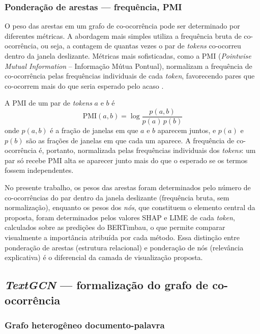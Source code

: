 \documentclass[
    12pt,                %
    openright,           %
    oneside,             %
    a4paper,             %
    english,             %
    brazil               %
]{abntex2}
\begin{document}
\subsubsection{Ponderação de arestas — frequência, PMI}
\label{subsubsec:grafos_ponderacao}

O peso das arestas em um grafo de co-ocorrência pode ser determinado por diferentes métricas. A abordagem mais simples utiliza a frequência bruta de co-ocorrência, ou seja, a contagem de quantas vezes o par de \textit{tokens} co-ocorreu dentro da janela deslizante. Métricas mais sofisticadas, como a PMI (\textit{Pointwise Mutual Information} -- Informação Mútua Pontual), normalizam a frequência de co-ocorrência pelas frequências individuais de cada \textit{token}, favorecendo pares que co-ocorrem mais do que seria esperado pelo acaso \cite{yao2019}.

A PMI de um par de \textit{tokens} $a$ e $b$ é
\begin{equation}
\text{PMI}(a,b) = \log\frac{p(a,b)}{p(a)\,p(b)}
\end{equation}
onde $p(a,b)$ é a fração de janelas em que $a$ e $b$ aparecem juntos, e $p(a)$ e $p(b)$ são as frações de janelas em que cada um aparece. A frequência de co-ocorrência é, portanto, normalizada pelas frequências individuais dos \textit{tokens}: um par só recebe PMI alta se aparecer junto mais do que o esperado se os termos fossem independentes.

No presente trabalho, os pesos das arestas foram determinados pelo número de co-ocorrências do par dentro da janela deslizante (frequência bruta, sem normalização), enquanto os pesos dos \textit{nós}, que constituem o elemento central da proposta, foram determinados pelos valores SHAP e LIME de cada \textit{token}, calculados sobre as predições do BERTimbau, o que permite comparar visualmente a importância atribuída por cada método. Essa distinção entre ponderação de arestas (estrutura relacional) e ponderação de nós (relevância explicativa) é o diferencial da camada de visualização proposta.

\subsection{\textit{TextGCN} — formalização do grafo de co-ocorrência}
\label{subsec:textgcn}

\subsubsection{Grafo heterogêneo documento-palavra}
\label{subsubsec:textgcn_grafo}
\end{document}

